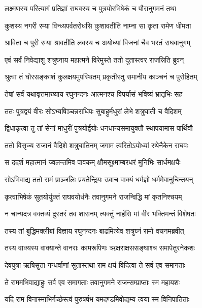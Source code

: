 \twolineshloka
{लक्ष्मणस्य परित्यागं प्रतिज्ञां राघवस्य च}
{पुत्रयोरभिषेकं च पौरानुगमनं तथा} %

\twolineshloka
{कुशस्य नगरी रम्या विन्ध्यपर्वतरोधसि}
{कुशावतीति नाम्ना सा कृता रामेण धीमता} %

\twolineshloka
{श्राविता च पुरी रम्या श्रावतीति लवस्य च}
{अयोध्यां विजनां चैव भरतं राघवानुगम्} %

\twolineshloka
{एवं सर्वं निवेद्याशु शत्रुघ्नाय महात्मने}
{विरेमुस्ते ततो दूतास्त्वर राजन्निति ब्रुवन्} %

\twolineshloka
{श्रुत्वा तं घोरसङ्काशं कुलक्षयमुपस्थितम्}
{प्रकृतीस्तु समानीय काञ्चनं च पुरोहितम्} %

\twolineshloka
{तेषां सर्वं यथावृत्तमाख्याय रघुनन्दनः}
{आत्मनश्च विपर्यासं भविष्यं भ्रातृभिः सह} %

\twolineshloka
{ततः पुत्रद्वयं वीरः सोऽभ्यषिञ्चन्नराधिपः}
{सुबाहुर्मधुरां लेभे शत्रुघाती च वैदिशम्} %

\twolineshloka
{द्विधाकृत्वा तु तां सेनां माधुरीं पुत्रयोर्द्वयोः}
{धनधान्यसमायुक्तौ स्थापयामास पार्थिवौ} %

\twolineshloka
{ततो विसृज्य राजानं वैदिशे शत्रुघातिनम्}
{जगाम त्वरितोऽयोध्यां रथेनैकेन राघवः} %

\twolineshloka
{स ददर्श महात्मानं ज्वलन्तमिव पावकम्}
{क्षौमसूक्ष्माम्बरधरं मुनिभिः सार्धमक्षयैः} %

\twolineshloka
{सोऽभिवाद्य ततो रामं प्राञ्जलिः प्रयतेन्द्रियः}
{उवाच वाक्यं धर्मज्ञो धर्ममेवानुचिन्तयन्} %

\twolineshloka
{कृत्वाभिषेकं सुतयोर्युक्तं राघवयोर्धनैः}
{तवानुगमने राजन्विद्धि मां कृतनिश्चयम्} %

\twolineshloka
{न चान्यदत्र वक्तव्यं दुस्तरं तव शासनम्}
{त्यक्तुं नार्हसि मां वीर भक्तिमन्तं विशेषतः} %

\twolineshloka
{तस्य तां बुद्धिमक्लीबां विज्ञाय रघुनन्दनः}
{बाढमित्येव शत्रुघ्नं रामो वचनमब्रवीत्} %

\twolineshloka
{तस्य वाक्यस्य वाक्यान्ते वानराः कामरूपिणः}
{ऋक्षराक्षससङ्घाश्च समापेतुरनेकशः} %

\twolineshloka
{देवपुत्रा ऋषिसुता गन्धर्वाणां सुतास्तथा}
{राम क्षयं विदित्वा ते सर्व एव समागताः} %

\twolineshloka
{ते राममभिवाद्याहुः सर्व एव समागताः}
{तवानुगमने राजन्सम्प्राप्ताः स्म महायशः} %

\twolineshloka
{यदि राम विनास्माभिर्गच्छेस्त्वं पुरुषर्षभ}
{यमदण्डमिवोद्यम्य त्वया स्म विनिपातिताः} %


